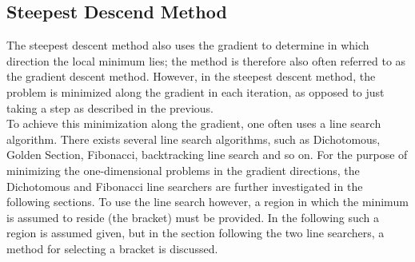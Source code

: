 \subsection{Steepest Descend Method}
The steepest descent method also uses the gradient to determine in which direction the local minimum lies; the method is therefore also often referred to as the gradient descent method. However, in the steepest descent method, the problem is minimized along the gradient in each iteration, as opposed to just taking a step as described in the previous.\\
To achieve this minimization along the gradient, one often uses a line search algorithm. There exists several line search algorithms, such as Dichotomous, Golden Section, Fibonacci, backtracking line search and so on. For the purpose of minimizing the one-dimensional problems in the gradient directions, the Dichotomous and Fibonacci line searchers are further investigated in the following sections. To use the line search however, a region in which the minimum is assumed to reside (the bracket) must be provided. In the following such a region is assumed given, but in the section following the two line searchers, a method for selecting a bracket is discussed.
